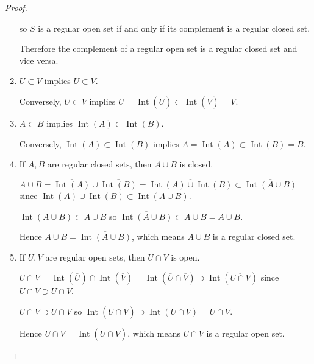 \begin{proof}
\begin{enumerate}[leftmargin=*,label={(\alph*)},itemsep=0pt]
		      so \( S \) is a regular open set if and only if its complement is a regular closed set.

		      Therefore the complement of a regular open set is a regular closed set and vice versa.
		\item \( U \subset V \) implies \( \overline{U} \subset \overline{V} \).

		      Conversely, \( \overline{U} \subset \overline{V} \) implies \( U = \operatorname{Int}(\overline{U}) \subset \operatorname{Int}(\overline{V}) = V \).

		\item \( A \subset B \) implies \( \operatorname{Int}(A) \subset \operatorname{Int}(B) \).

		      Conversely, \( \operatorname{Int}(A) \subset \operatorname{Int}(B) \) implies \( A = \overline{\operatorname{Int}(A)} \subset \overline{\operatorname{Int}(B)} = B \).
		\item If \( A, B \) are regular closed sets, then \( A \cup B \) is closed.

		      \( A \cup B = \overline{\operatorname{Int}(A)} \cup \overline{\operatorname{Int}(B)} = \overline{\operatorname{Int}(A) \cup \operatorname{Int}(B)} \subset \overline{\operatorname{Int}(A \cup B)} \) since \( \operatorname{Int}(A) \cup \operatorname{Int}(B) \subset \operatorname{Int}(A \cup B) \).

		      \( \operatorname{Int}(A \cup B) \subset A \cup B \) so \( \overline{\operatorname{Int}(A \cup B)} \subset \overline{A \cup B} = A \cup B \).

		      Hence \( A \cup B = \overline{\operatorname{Int}(A \cup B)} \), which means \( A \cup B \) is a regular closed set.
		\item If \( U, V \) are regular open sets, then \( U \cap V \) is open.

		      \( U \cap V = \operatorname{Int}(\overline{U}) \cap \operatorname{Int}(\overline{V}) = \operatorname{Int}(\overline{U} \cap \overline{V}) \supset \operatorname{Int}(\overline{U \cap V}) \) since \( \overline{U} \cap \overline{V} \supset \overline{U \cap V} \).

		      \( \overline{U \cap V} \supset U \cap V \) so \( \operatorname{Int}(\overline{U \cap V}) \supset \operatorname{Int}(U \cap V) = U \cap V \).

		      Hence \( U \cap V = \operatorname{Int}(\overline{U \cap V}) \), which means \( U \cap V \) is a regular open set.
	\end{enumerate}
\end{proof}

